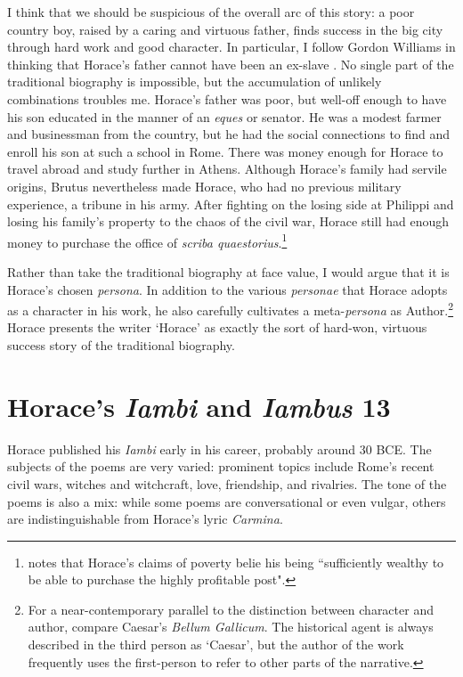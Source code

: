 I think that we should be suspicious of the overall arc of this story: a poor country boy, raised by a caring and virtuous father, finds success in the big city through hard work and good character.  In particular, I follow Gordon Williams in thinking that Horace's father cannot have been an ex-slave \citep{williams1995}.  No single part of the traditional biography is impossible, but the accumulation of unlikely combinations troubles me.  Horace's father was poor, but well-off enough to have his son educated in the manner of an \textit{eques} or senator.  He was a modest farmer and businessman from the country, but he had the social connections to find and enroll his son at such a school in Rome.  There was money enough for Horace to travel abroad and study further in Athens.  Although Horace's family had servile origins, Brutus nevertheless made Horace, who had no previous military experience, a tribune in his army.  After fighting on the losing side at Philippi and losing his family's property to the chaos of the civil war, Horace still had enough money to purchase the office of \textit{scriba quaestorius}.\footnote{\citet[104]{williams1995} notes that Horace's claims of poverty belie his being ``sufficiently wealthy to be able to purchase the highly profitable post".}

Rather than take the traditional biography at face value, I would argue that it is Horace's chosen \textit{persona}.  In addition to the various \textit{personae} that Horace adopts as a character in his work, he also carefully cultivates a meta-\textit{persona} as Author.\footnote{For a near-contemporary parallel to the distinction between character and author, compare Caesar's \textit{Bellum Gallicum}.  The historical agent is always described in the third person as `Caesar', but the author of the work frequently uses the first-person to refer to other parts of the narrative.}  Horace presents the writer `Horace' as exactly the sort of hard-won, virtuous success story of the traditional biography.


\section*{Horace's \textit{Iambi} and \textit{Iambus} 13}

Horace published his \textit{Iambi} early in his career, probably around 30 BCE.  The subjects of the poems are very varied: prominent topics include Rome's recent civil wars, witches and witchcraft, love, friendship, and rivalries.  The tone of the poems is also a mix: while some poems are conversational or even vulgar, others are indistinguishable from Horace's lyric \textit{Carmina}.

